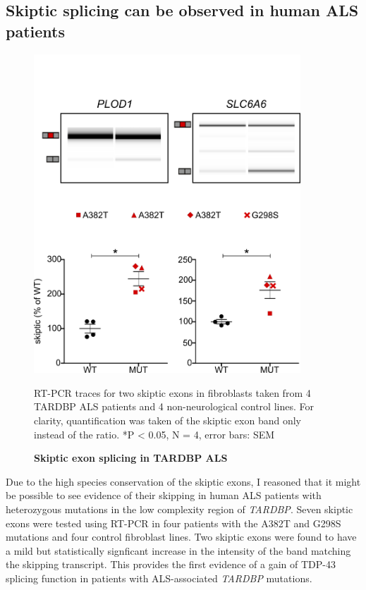 \subsection{Skiptic splicing can be observed in human ALS patients}
\begin{figure}[h!]
	\centering
	\includegraphics[width=10cm]{Figures/05_tdp_mice/skiptic_patients.png}
	\caption{\textbf{Skiptic exon splicing in TARDBP ALS}}
		RT-PCR traces for two skiptic exons in fibroblasts taken from 4 TARDBP ALS patients and 4 non-neurological control lines. For clarity, quantification was taken of the skiptic exon band only instead of the ratio. *P < 0.05, N = 4, error bars: SEM
	\label{fig:skiptic_patients}
\end{figure}

Due to the high species conservation of the skiptic exons, I reasoned that it might be possible to see evidence of their skipping in human ALS patients with heterozygous mutations in the low complexity region of \textit{TARDBP}. Seven skiptic exons were tested using RT-PCR in four patients with the A382T and G298S mutations and four control fibroblast lines. 
Two skiptic exons were found to have a mild but statistically signficant increase in the intensity of the band matching the skipping transcript.	
This provides the first evidence of a gain of TDP-43 splicing function in patients with ALS-associated \textit{TARDBP} mutations.

